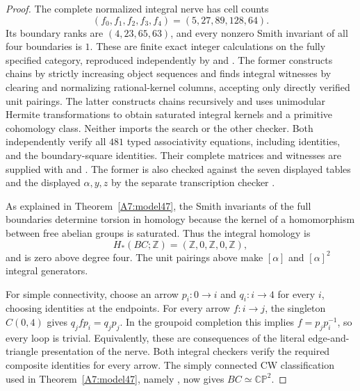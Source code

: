 \begin{proof}
The complete normalized integral nerve has cell counts
\[
 (f_0,f_1,f_2,f_3,f_4)=(5,27,89,128,64).
\]
Its boundary ranks are $(4,23,65,63)$, and every nonzero Smith
invariant of all four boundaries is $1$. These are finite exact
integer calculations on the fully specified category, reproduced
independently by
 and
.
The former constructs chains by strictly increasing object
sequences and finds integral witnesses by clearing and normalizing
rational-kernel columns, accepting only directly verified unit
pairings. The latter constructs chains recursively and uses
unimodular Hermite transformations to obtain saturated integral
kernels and a primitive cohomology class. Neither imports the
search or the other checker. Both independently verify all $481$
typed associativity equations, including identities, and the
boundary-square identities. Their complete matrices and witnesses
are supplied with
 and
.
The former is also checked against the seven displayed tables and
the displayed $\alpha,y,z$ by the separate transcription checker
.

As explained in Theorem~\ref{A7:model47}, the Smith invariants
of the full boundaries determine torsion in homology because
the kernel of a homomorphism between free abelian groups is
saturated. Thus the integral homology is
\[
 H_*(BC;\mathbb Z)=(\mathbb Z,0,\mathbb Z,0,\mathbb Z),
\]
and is zero above degree four. The unit pairings above make
$[\alpha]$ and $[\alpha]^2$ integral generators.

For simple connectivity, choose an arrow $p_i:0\to i$ and
$q_i:i\to4$ for every $i$, choosing identities at the endpoints.
For every arrow $f:i\to j$, the singleton $C(0,4)$ gives
$q_jfp_i=q_jp_j$. In the groupoid completion this implies
$f=p_jp_i^{-1}$, so every loop is trivial. Equivalently, these
are consequences of the literal edge-and-triangle presentation
of the nerve. Both integral checkers verify the required
composite identities for every arrow. The simply connected CW
classification used in Theorem~\ref{A7:model47}, namely
\cite[Proposition~4C.3, pp.~430--431]{CP2-Hatcher2002}, now gives
$BC\simeq\mathbb{CP}^2$.
\end{proof}

